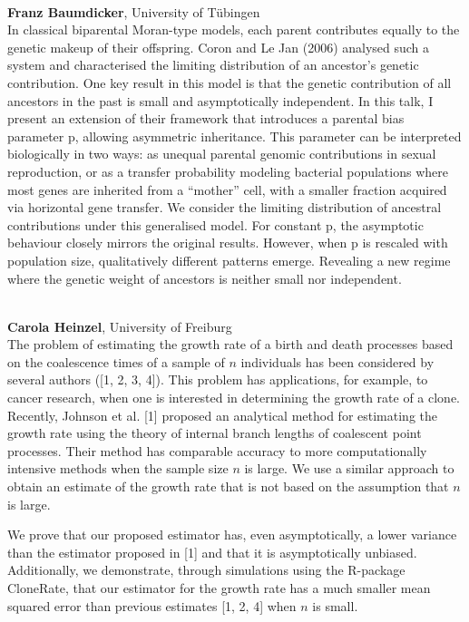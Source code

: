\documentclass[12pt,a4paper]{article}
\begin{document}
\\[1ex]{ \large \textbf{ Franz Baumdicker}}, University of Tübingen \\[2ex] In classical biparental Moran-type models, each parent contributes equally to the genetic makeup of their offspring. Coron and Le Jan (2006) analysed such a system and characterised the limiting distribution of an ancestor’s genetic contribution. One key result in this model is that the genetic contribution of all ancestors in the past is small and asymptotically independent. In this talk, I present an extension of their framework that introduces a parental bias parameter p, allowing asymmetric inheritance. This parameter can be interpreted biologically in two ways: as unequal parental genomic contributions in sexual reproduction, or as a transfer probability modeling bacterial populations where most genes are inherited from a “mother” cell, with a smaller fraction acquired via horizontal gene transfer. We consider the limiting distribution of ancestral contributions under this generalised model. For constant p, the asymptotic behaviour closely mirrors the original results. However, when p is rescaled with population size, qualitatively different patterns emerge. Revealing a new regime where the genetic weight of ancestors is neither small nor independent. 

\bigskip\bigskip

\\[1ex]{ \large \textbf{ Carola Heinzel}}, University of Freiburg \\[2ex] The problem of estimating the growth rate of a birth and death processes based on the coalescence times of a sample of $n$ individuals has been considered by several authors ([1, 2, 3, 4]). This problem has applications, for example, to cancer research, when one is interested in determining the growth rate of a clone. Recently, Johnson et al. [1] proposed an analytical method for estimating the growth rate using the theory of internal branch lengths of coalescent point processes. Their method has comparable accuracy to more computationally intensive methods when the sample size $n$ is large. We use a similar approach to obtain an estimate of the growth rate that is not based on the assumption that $n$ is large. 

 We prove that our proposed estimator has, even asymptotically, a lower variance than the estimator proposed in [1] and that it is asymptotically unbiased. Additionally, we demonstrate, through simulations using the R-package CloneRate, that our estimator for the growth rate has a much smaller mean squared error than previous estimates [1, 2, 4] when $n$ is small. 
\end{document}
